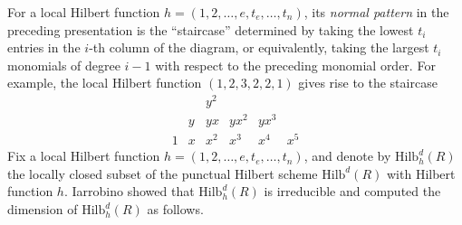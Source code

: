 \documentclass[12pt,oneside,reqno]{amsart}
\theoremstyle{definition}
\begin{document}
For a local Hilbert function $h = (1, 2, \dots, e, t_{e}, \dots, t_n)$, its \textit{normal pattern} in the preceding presentation is the ``staircase'' determined by taking the lowest $t_i$ entries in the $i$-th column of the diagram, or equivalently, taking the largest $t_i$ monomials of degree $i - 1$ with respect to the preceding monomial order. For example, the local Hilbert function $(1, 2, 3, 2, 2, 1)$ gives rise to the staircase
\[
\begin{matrix}
& & y^2 &  &  &  \\
& y & yx & yx^2 & yx^3 &  \\
1 & x & x^2 & x^3 & x^4 & x^5
\end{matrix}
\]
Fix a local Hilbert function $h = (1, 2, \dots, e, t_{e}, \dots, t_n)$, and denote by $\mathrm{Hilb}^d_h(R)$ the locally closed subset of the punctual Hilbert scheme $\mathrm{Hilb}^d(R)$ with Hilbert function $h$. Iarrobino showed that $\mathrm{Hilb}^d_h(R)$ is irreducible and computed the dimension of $\mathrm{Hilb}^d_h(R)$ as follows. 
\end{document}
